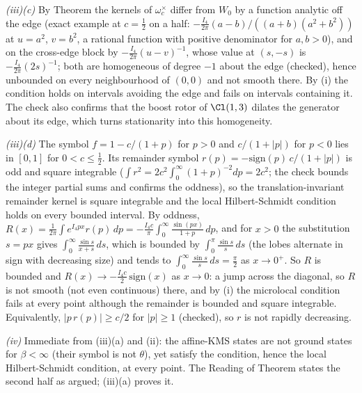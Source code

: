 \emph{(iii)(c)} By Theorem  the kernels of $\omega_{c}^{\times}$ differ from $W_{0}$ by a function analytic off the edge (exact example at $c = \tfrac12$ on a half: $-\tfrac{I_{4}}{2\pi}(a - b)/((a + b)(a^{2} + b^{2}))$ at $u = a^{2}$, $v = b^{2}$, a rational function with positive denominator for $a, b > 0$), and on the cross-edge block by $-\tfrac{I_{4}}{2\pi}(u - v)^{-1}$, whose value at $(s, -s)$ is $-\tfrac{I_{4}}{2\pi}(2s)^{-1}$; both are homogeneous of degree $-1$ about the edge (checked), hence unbounded on every neighbourhood of $(0, 0)$ and not smooth there. By (i) the condition holds on intervals avoiding the edge and fails on intervals containing it. The check also confirms that the boost rotor of $\Cl(1,3)$ dilates the generator about its edge, which turns stationarity into this homogeneity.

\emph{(iii)(d)} The symbol $f = 1 - c/(1 + p)$ for $p > 0$ and $c/(1 + |p|)$ for $p < 0$ lies in $[0, 1]$ for $0 < c \le \tfrac12$. Its remainder symbol $r(p) = -\mathrm{sign}(p)\,c/(1 + |p|)$ is odd and square integrable ($\int r^{2} = 2c^{2}\int_{0}^{\infty}(1 + p)^{-2}dp = 2c^{2}$; the check bounds the integer partial sums and confirms the oddness), so the translation-invariant remainder kernel is square integrable and the local Hilbert-Schmidt condition holds on every bounded interval. By oddness, $R(x) = \tfrac{1}{2\pi}\int e^{I_{4}px}r(p)\,dp = -\tfrac{I_{4}c}{\pi}\int_{0}^{\infty}\tfrac{\sin(px)}{1 + p}\,dp$, and for $x > 0$ the substitution $s = px$ gives $\int_{0}^{\infty}\tfrac{\sin s}{x + s}\,ds$, which is bounded by $\int_{0}^{\pi}\tfrac{\sin s}{s}\,ds$ (the lobes alternate in sign with decreasing size) and tends to $\int_{0}^{\infty}\tfrac{\sin s}{s}\,ds = \tfrac{\pi}{2}$ as $x \to 0^{+}$. So $R$ is bounded and $R(x) \to -\tfrac{I_{4}c}{2}\,\mathrm{sign}(x)$ as $x \to 0$: a jump across the diagonal, so $R$ is not smooth (not even continuous) there, and by (i) the microlocal condition fails at every point although the remainder is bounded and square integrable. Equivalently, $|p\,r(p)| \ge c/2$ for $|p| \ge 1$ (checked), so $r$ is not rapidly decreasing.

\emph{(iv)} Immediate from (iii)(a) and (ii): the affine-KMS states are not ground states for $\beta < \infty$ (their symbol is not $\theta$), yet satisfy the condition, hence the local Hilbert-Schmidt condition, at every point. The Reading of Theorem  states the second half as argued; (iii)(a) proves it.

